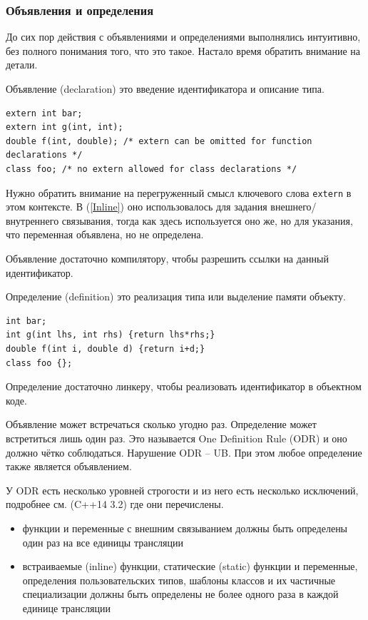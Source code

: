 \documentclass[a4paper,12pt,oneside]{article}
\begin{document}
\subsubsection{Объявления и определения}\label{DeclVsDef}

До сих пор действия с объявлениями и определениями выполнялись интуитивно, без полного понимания того, что это такое. Настало время обратить внимание на детали.

Объявление (declaration) это введение идентификатора и описание типа.

\begin{lstlisting}
extern int bar;
extern int g(int, int);
double f(int, double); /* extern can be omitted for function declarations */
class foo; /* no extern allowed for class declarations */
\end{lstlisting}

Нужно обратить внимание на перегруженный смысл ключевого слова \lstinline!extern! в этом контексте. В (\ref{Inline}) оно использовалось для задания внешнего/внутреннего связывания, тогда как здесь используется оно же, но для указания, что переменная объявлена, но не определена.

Объявление достаточно компилятору, чтобы разрешить ссылки на данный идентификатор. 

Определение (definition) это реализация типа или выделение памяти объекту.

\begin{lstlisting}
int bar;
int g(int lhs, int rhs) {return lhs*rhs;}
double f(int i, double d) {return i+d;}
class foo {};
\end{lstlisting}

Определение достаточно линкеру, чтобы реализовать идентификатор в объектном коде. 

Объявление может встречаться сколько угодно раз. Определение может встретиться лишь один раз. Это называется One Definition Rule (ODR) и оно должно чётко соблюдаться. Нарушение ODR -- UB. При этом любое определение также является объявлением.

У ODR есть несколько уровней строгости и из него есть несколько исключений, подробнее см. (C++14 3.2) где они перечислены.

\begin{itemize}
\item функции и переменные с внешним связыванием должны быть определены один раз на все единицы трансляции
\item встраиваемые (inline) функции, статические (static) функции и переменные, определения пользовательских типов, шаблоны классов и их частичные специализации должны быть определены не более одного раза в каждой единице трансляции
\end{itemize}
\end{document}
